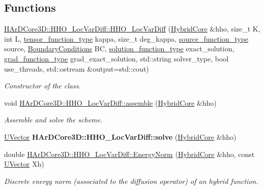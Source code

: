 \subsection*{Functions}
\begin{DoxyCompactItemize}
\item 
\hyperlink{group__HHO__LocVarDiff_ga6a6f808bf86dd5d3a757422b89df407b}{H\+Ar\+D\+Core3\+D\+::\+H\+H\+O\+\_\+\+Loc\+Var\+Diff\+::\+H\+H\+O\+\_\+\+Loc\+Var\+Diff} (\hyperlink{classHArDCore3D_1_1HybridCore}{Hybrid\+Core} \&hho, size\+\_\+t K, int L, \hyperlink{classHArDCore3D_1_1HHO__LocVarDiff_a70a4ae64b7a421bf535c669f340b2641}{tensor\+\_\+function\+\_\+type} kappa, size\+\_\+t deg\+\_\+kappa, \hyperlink{classHArDCore3D_1_1HHO__LocVarDiff_ab56032fb1c52e4a24e75af0002d0a2d4}{source\+\_\+function\+\_\+type} source, \hyperlink{classBoundaryConditions}{Boundary\+Conditions} BC, \hyperlink{classHArDCore3D_1_1HHO__LocVarDiff_a7b0e23cbc8db30ca257c47df7fd4ca25}{solution\+\_\+function\+\_\+type} exact\+\_\+solution, \hyperlink{classHArDCore3D_1_1HHO__LocVarDiff_aac4d74b1420ac542bcc2b96c11ccba55}{grad\+\_\+function\+\_\+type} grad\+\_\+exact\+\_\+solution, std\+::string solver\+\_\+type, bool use\+\_\+threads, std\+::ostream \&output=std\+::cout)
\begin{DoxyCompactList}\small\item\em Constructor of the class. \end{DoxyCompactList}\item 
\mbox{\label{group__HHO__LocVarDiff_ga5fa4c3b9a58d7208198ee0d6860c093a}} 
void \hyperlink{group__HHO__LocVarDiff_ga5fa4c3b9a58d7208198ee0d6860c093a}{H\+Ar\+D\+Core3\+D\+::\+H\+H\+O\+\_\+\+Loc\+Var\+Diff\+::assemble} (\hyperlink{classHArDCore3D_1_1HybridCore}{Hybrid\+Core} \&hho)
\begin{DoxyCompactList}\small\item\em Assemble and solve the scheme. \end{DoxyCompactList}\item 
\mbox{\label{group__HHO__LocVarDiff_ga11bf9be780b53676d2cc1ec9bb30dcc6}} 
\hyperlink{classHArDCore3D_1_1UVector}{U\+Vector} {\bfseries H\+Ar\+D\+Core3\+D\+::\+H\+H\+O\+\_\+\+Loc\+Var\+Diff\+::solve} (\hyperlink{classHArDCore3D_1_1HybridCore}{Hybrid\+Core} \&hho)
\item 
\mbox{\label{group__HHO__LocVarDiff_ga19858d12d0b2dd817aac99a36f390e2e}} 
double \hyperlink{group__HHO__LocVarDiff_ga19858d12d0b2dd817aac99a36f390e2e}{H\+Ar\+D\+Core3\+D\+::\+H\+H\+O\+\_\+\+Loc\+Var\+Diff\+::\+Energy\+Norm} (\hyperlink{classHArDCore3D_1_1HybridCore}{Hybrid\+Core} \&hho, const \hyperlink{classHArDCore3D_1_1UVector}{U\+Vector} Xh)
\begin{DoxyCompactList}\small\item\em Discrete energy norm (associated to the diffusion operator) of an hybrid function. \end{DoxyCompactList}\end{DoxyCompactItemize}


